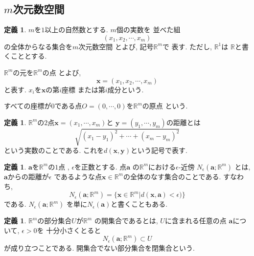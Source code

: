 \documentclass[a4j,12pt]{jarticle}
\theoremstyle{definition}
\newtheorem{definition}[theorem]{定義}
\newtheorem{proposition}[theorem]{命題}
\begin{document}
\subsection{$m$次元数空間}
\begin{definition}
    $m$を$1$以上の自然数とする. $m$個の実数を
    並べた組
    $$(x_1,x_2, \cdots ,x_m)$$
    の全体からなる集合を$m$次元数空間
    とよび, 記号$\mathbb{R}^m$で
    表す. ただし, $\mathbb{R}^1$は
    $\mathbb{R}$と書くこととする. 

    $\mathbb{R}^m$の元を$\mathbb{R}^m$の点
    とよび, 
    $$\boldsymbol{x}=(x_1,x_2, \cdots ,x_m)$$
    と表す. $x_i$を$\boldsymbol{x}$の第$i$座標
    または第$i$成分という. 

    すべての座標が$0$である点$O
    =(0,\cdots ,0)$を$\mathbb{R}^m$の原点
    という. 
\end{definition}
\begin{definition}
    $\mathbb{R}^m$の$2$点$\boldsymbol{x}
    =(x_1,\cdots ,x_m)$と
    $\boldsymbol{y}
    =(y_1,\cdots ,y_m)$の距離とは
    $$\sqrt{(x_1-y_1)^2+\cdots +(x_m-y_m)^2}$$
    という実数のことである. これを$d(\boldsymbol{x},
    \boldsymbol{y})$という記号で表す. 
\end{definition}
\begin{definition}
    $\boldsymbol{a}$を$\mathbb{R}^m$の$1$点
    , $\epsilon$を正数とする. 点$\boldsymbol{a}$
    の$\mathbb{R}^m$における$\epsilon$-近傍
    $N_\epsilon(\boldsymbol{a};\mathbb{R}^m)$
    とは, $\boldsymbol{a}$からの距離が$\epsilon$
    であるような点$\boldsymbol{x}\in 
    \mathbb{R}^m$の全体のなす集合のことである. 
    すなわち, 
    $$N_\epsilon(\boldsymbol{a};\mathbb{R}^m)=
    \{\boldsymbol{x}\in \mathbb{R}^m
    |d(\boldsymbol{x},\boldsymbol{a})<\epsilon)
    \}$$
    である. $N_\epsilon(\boldsymbol{a};\mathbb{R}^m)$
    を単に$N_\epsilon(\boldsymbol{a})$と書くこともある. 
\end{definition}
\begin{definition}
    $\mathbb{R}^m$の部分集合$U$が$\mathbb{R}^m$
    の開集合であるとは, $U$に含まれる任意の点
    $\boldsymbol{a}$について, $\epsilon>0$を
    十分小さくとると
    $$N_\epsilon(\boldsymbol{a};\mathbb{R}^m)
    \subset U$$
    が成り立つことである. 
    開集合でない部分集合を閉集合という. 
\end{definition}

\end{document}
